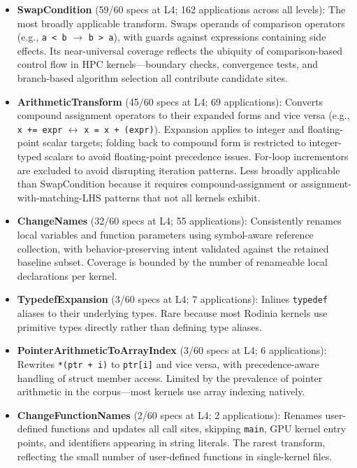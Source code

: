 \begin{itemize}
  \item \textbf{SwapCondition} (59/60 specs at L4; 162 applications across all levels): The most broadly applicable transform. Swaps operands of comparison operators (e.g., \texttt{a < b} $\rightarrow$ \texttt{b > a}), with guards against expressions containing side effects. Its near-universal coverage reflects the ubiquity of comparison-based control flow in HPC kernels---boundary checks, convergence tests, and branch-based algorithm selection all contribute candidate sites.
  
  \item \textbf{ArithmeticTransform} (45/60 specs at L4; 69 applications): Converts compound assignment operators to their expanded forms and vice versa (e.g., \texttt{x += expr} $\leftrightarrow$ \texttt{x = x + (expr)}). Expansion applies to integer and floating-point scalar targets; folding back to compound form is restricted to integer-typed scalars to avoid floating-point precedence issues. For-loop incrementors are excluded to avoid disrupting iteration patterns. Less broadly applicable than SwapCondition because it requires compound-assignment or assignment-with-matching-LHS patterns that not all kernels exhibit.
  \item \textbf{ChangeNames} (32/60 specs at L4; 55 applications): Consistently renames local variables and function parameters using symbol-aware reference collection, with behavior-preserving intent validated against the retained baseline subset. Coverage is bounded by the number of renameable local declarations per kernel.
  
  \item \textbf{TypedefExpansion} (3/60 specs at L4; 7 applications): Inlines \texttt{typedef} aliases to their underlying types. Rare because most Rodinia kernels use primitive types directly rather than defining type aliases.
  
  \item \textbf{PointerArithmeticToArrayIndex} (3/60 specs at L4; 6 applications): Rewrites \texttt{*(ptr + i)} to \texttt{ptr[i]} and vice versa, with precedence-aware handling of struct member access. Limited by the prevalence of pointer arithmetic in the corpus---most kernels use array indexing natively.
  
  \item \textbf{ChangeFunctionNames} (2/60 specs at L4; 2 applications): Renames user-defined functions and updates all call sites, skipping \texttt{main}, GPU kernel entry points, and identifiers appearing in string literals. The rarest transform, reflecting the small number of user-defined functions in single-kernel files.
\end{itemize}



